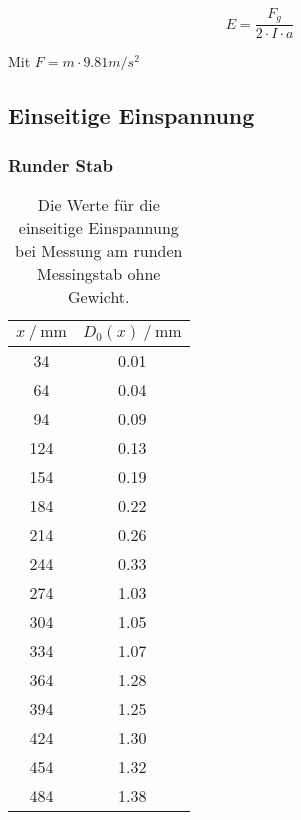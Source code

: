 \begin{equation}
   E = \frac{F_g}{2 \cdot I \cdot a}   
\end{equation}

Mit $F = m \cdot 9.81 m/s^2$



\subsection{Einseitige Einspannung}
\label{sec:EinseitigeEinspannungAusw}

      \subsubsection{Runder Stab}
      \label{sec:Runder Stab}


\begin{table}[H]
  \centering
  \caption{Die Werte für die einseitige Einspannung bei Messung am runden Messingstab ohne Gewicht.}
  \begin{tabular}{cc}
    \toprule
    {$x \mathbin{/} \unit{\milli\metre}$} &
    {$D_0(x) \mathbin{/} \unit{\milli\metre}$} \\
    \midrule
     34 & 0.01 \\  
     64 & 0.04 \\
     94 & 0.09 \\
    124 & 0.13 \\  
    154 & 0.19 \\
    184 & 0.22 \\
    214 & 0.26 \\
    244 & 0.33 \\
    274 & 1.03 \\
    304 & 1.05 \\
    334 & 1.07 \\
    364 & 1.28 \\
    394 & 1.25 \\
    424 & 1.30 \\
    454 & 1.32 \\
    484 & 1.38 \\

    \bottomrule
  \end{tabular}
  \label{tab:Tabelle1}
\end{table}



